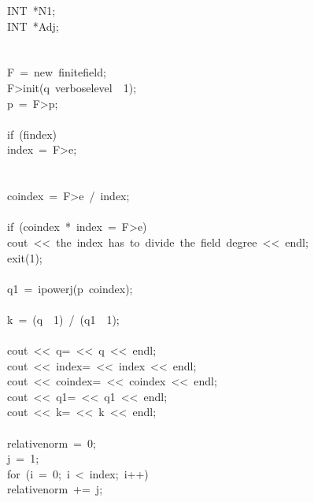 \begin{tabbing}
\>INT\ *N1;\\[0pt]
\>INT\ *Adj;\\[0pt]
\>\\[0pt]
\\[0pt]
\>F\ =\ new\ finitefield;\\[0pt]
\>F>init(q\ verboselevel\ \ 1);\\[0pt]
\>p\ =\ F>p;\\[0pt]
\\[0pt]
\>if\ (findex)\ \\[0pt]
\>\>index\ =\ F>e;\\[0pt]
\>\>\\[0pt]
\\[0pt]
\>coindex\ =\ F>e\ /\ index;\\[0pt]
\\[0pt]
\>if\ (coindex\ *\ index\ =\ F>e)\ \\[0pt]
\>\>cout\ <<\ the\ index\ has\ to\ divide\ the\ field\ degree\ <<\ endl;\\[0pt]
\>\>exit(1);\\[0pt]
\>\>\\[0pt]
\>q1\ =\ ipowerj(p\ coindex);\\[0pt]
\\[0pt]
\>k\ =\ (q\ \ 1)\ /\ (q1\ \ 1);\\[0pt]
\\[0pt]
\>cout\ <<\ q=\ <<\ q\ <<\ endl;\\[0pt]
\>cout\ <<\ index=\ <<\ index\ <<\ endl;\\[0pt]
\>cout\ <<\ coindex=\ <<\ coindex\ <<\ endl;\\[0pt]
\>cout\ <<\ q1=\ <<\ q1\ <<\ endl;\\[0pt]
\>cout\ <<\ k=\ <<\ k\ <<\ endl;\\[0pt]
\\[0pt]
\>relativenorm\ =\ 0;\\[0pt]
\>j\ =\ 1;\\[0pt]
\>for\ (i\ =\ 0;\ i\ <\ index;\ i++)\ \\[0pt]
\>\>relativenorm\ +=\ j;\\[0pt]

\end{tabbing}
